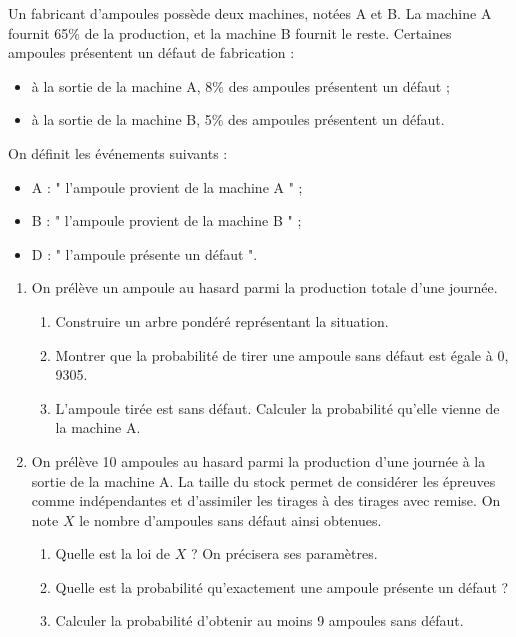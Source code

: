 \documentclass[11pt,fleqn, openany]{book} %
\begin{document}
\begin{exercise}[topic=prob13, subtitle={(Antilles - Guyane 2016)}]

Un fabricant d'ampoules possède deux machines, notées A et B. La machine A fournit 65\% de la production, et la machine B fournit le reste. Certaines ampoules présentent un défaut de fabrication :
\begin{itemize}
\item à la sortie de la machine A, 8\% des ampoules présentent un défaut ;
\item à la sortie de la machine B, 5\% des ampoules présentent un défaut.\end{itemize}
On définit les événements suivants :
\begin{itemize}
\item A : " l'ampoule provient de la machine A " ;
\item B : " l'ampoule provient de la machine B " ;
\item D : " l'ampoule présente un défaut ".
\end{itemize}
\begin{enumerate}
\item On prélève un ampoule au hasard parmi la production totale d'une journée.
\begin{enumerate}
\item Construire un arbre pondéré représentant la situation.
\item Montrer que la probabilité de tirer une ampoule sans défaut est égale à 0, 9305.
\item L'ampoule tirée est sans défaut. Calculer la probabilité qu'elle vienne de la machine A.
\end{enumerate}
\item On prélève 10 ampoules au hasard parmi la production d'une journée à la sortie de la machine A. La taille du stock permet de considérer les épreuves comme indépendantes et d'assimiler les tirages à des tirages avec remise. On note $X$ le nombre d'ampoules sans défaut ainsi obtenues.
\begin{enumerate}
\item Quelle est la loi de $X$ ? On précisera ses paramètres.
\item Quelle est la probabilité qu'exactement une ampoule présente un défaut ?
\item Calculer la probabilité d'obtenir au moins 9 ampoules sans défaut.
\end{enumerate}

\end{enumerate}\end{exercise}
\end{document}
